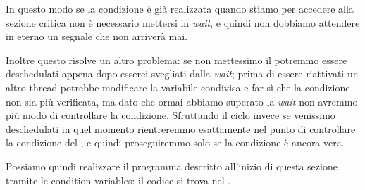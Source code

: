 In questo modo se la condizione è già realizzata quando stiamo per accedere alla sezione critica non è necessario mettersi in \emph{wait}, e quindi non dobbiamo attendere in eterno un segnale che non arriverà mai.

Inoltre questo risolve un altro problema: se non mettessimo il  potremmo essere deschedulati appena dopo esserci svegliati dalla \emph{wait}; prima di essere riattivati un altro thread potrebbe modificare la variabile condivisa e far sì che la condizione non sia più verificata, ma dato che ormai abbiamo superato la \emph{wait} non avremmo più modo di controllare la condizione.
Sfruttando il ciclo  invece se venissimo deschedulati in quel momento rientreremmo esattamente nel punto di controllare la condizione del , e quindi proseguiremmo solo se la condizione è ancora vera.

Possiamo quindi realizzare il programma descritto all'inizio di questa sezione tramite le condition variables: il codice si trova nel .